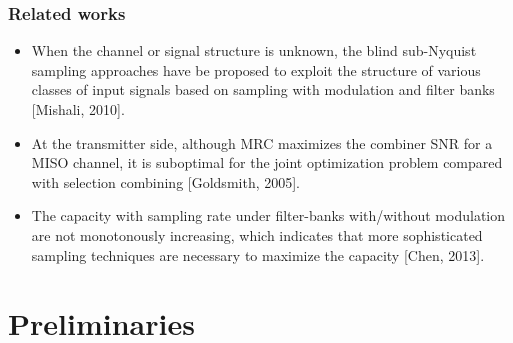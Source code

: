 \documentclass{beamer}
\begin{document}
\begin{frame}
\frametitle{Related works}
\begin{itemize}
  \item When the channel or signal structure is unknown, the blind sub-Nyquist sampling approaches have be proposed to exploit the structure of various classes of input signals based on sampling with modulation and filter banks [Mishali, 2010].
  \item At the transmitter side, although MRC maximizes the combiner SNR for a MISO channel, it is suboptimal for the joint optimization problem compared with selection combining [Goldsmith, 2005].
  \item The capacity with sampling rate under filter-banks with/without modulation are not monotonously increasing, which indicates that more sophisticated sampling techniques are necessary to maximize the capacity  [Chen, 2013].

\end{itemize}
\end{frame}


\section{Preliminaries}
\end{document}
